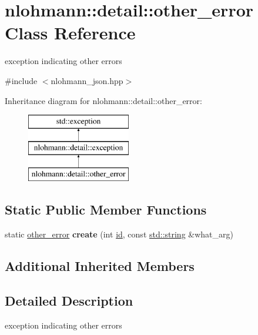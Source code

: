 \hypertarget{classnlohmann_1_1detail_1_1other__error}{}\section{nlohmann\+:\+:detail\+:\+:other\+\_\+error Class Reference}
\label{classnlohmann_1_1detail_1_1other__error}


exception indicating other errors  




{\ttfamily \#include $<$nlohmann\+\_\+json.\+hpp$>$}

Inheritance diagram for nlohmann\+:\+:detail\+:\+:other\+\_\+error\+:\begin{figure}[H]
\begin{center}
\leavevmode
\includegraphics[height=3.000000cm]{d5/d1b/classnlohmann_1_1detail_1_1other__error}
\end{center}
\end{figure}
\subsection*{Static Public Member Functions}
\begin{DoxyCompactItemize}
\item 
\mbox{\label{classnlohmann_1_1detail_1_1other__error_a1443f7682e7dd05144a577f0d3765c63}} 
static \hyperlink{classnlohmann_1_1detail_1_1other__error}{other\+\_\+error} {\bfseries create} (int \hyperlink{classnlohmann_1_1detail_1_1exception_a0d4589a3fb54e81646d986c05efa3b9a}{id}, const \hyperlink{namespacenlohmann_1_1detail_a90aa5ef615aa8305e9ea20d8a947980fab45cffe084dd3d20d928bee85e7b0f21}{std\+::string} \&what\+\_\+arg)
\end{DoxyCompactItemize}
\subsection*{Additional Inherited Members}


\subsection{Detailed Description}
exception indicating other errors 

